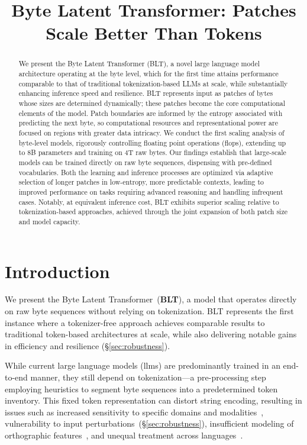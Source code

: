 \title{Byte Latent Transformer: Patches Scale Better Than Tokens}

\begin{abstract}
We present the Byte Latent Transformer ({\textsc BLT}), a novel large language model architecture operating at the byte level, which for the first time attains performance comparable to that of traditional tokenization-based LLMs at scale, while substantially enhancing inference speed and resilience. 
{\textsc BLT} represents input as patches of bytes whose sizes are determined dynamically; these patches become the core computational elements of the model. Patch boundaries are informed by the entropy associated with predicting the next byte, so computational resources and representational power are focused on regions with greater data intricacy. We conduct the first scaling analysis of byte-level models, rigorously controlling floating point operations (flops), extending up to 8B parameters and training on 4T raw bytes. Our findings establish that large-scale models can be trained directly on raw byte sequences, dispensing with pre-defined vocabularies. Both the learning and inference processes are optimized via adaptive selection of longer patches in low-entropy, more predictable contexts, leading to improved performance on tasks requiring advanced reasoning and handling infrequent cases. Notably, at equivalent inference cost, {\textsc BLT} exhibits superior scaling relative to tokenization-based approaches, achieved through the joint expansion of both patch size and model capacity.
\end{abstract}

\section{Introduction}
\label{section:intro}

We present the Byte Latent Transformer~(\textbf{BLT}), a model that operates directly on raw byte sequences without relying on tokenization. BLT represents the first instance where a tokenizer-free approach achieves comparable results to traditional token-based architectures at scale, while also delivering notable gains in efficiency and resilience (\S\ref{sec:robustness}).

While current large language models (llms) are predominantly trained in an end-to-end manner, they still depend on tokenization—a pre-processing step employing heuristics to segment byte sequences into a predetermined token inventory. This fixed token representation can distort string encoding, resulting in issues such as increased sensitivity to specific domains and modalities~\citep{dagangetting}, vulnerability to input perturbations~(\S\ref{sec:robustness}), insufficient modeling of orthographic features~\citep{edman2024cute}, and unequal treatment across languages~\citep{liang2023xlm,petrov2024language,limisiewicz2024myte}.

